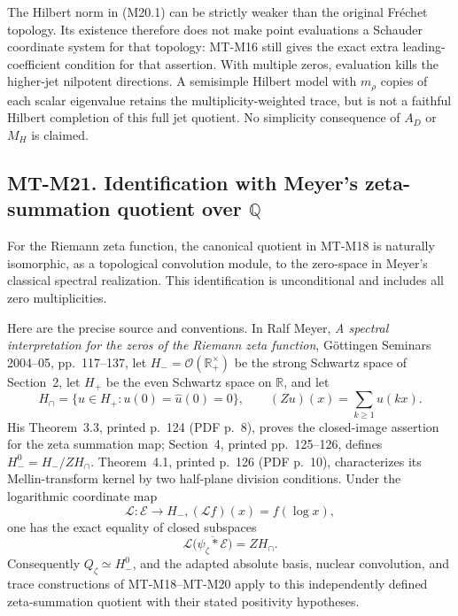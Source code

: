\documentclass[11pt,a4paper]{article}
\begin{document}
The Hilbert norm in (M20.1) can be strictly weaker than
the original Fr\'echet topology. Its existence therefore
does not make point evaluations a Schauder coordinate
system for that topology: MT-M16 still gives the exact
extra leading-coefficient condition for that assertion.
With multiple zeros, evaluation kills the higher-jet
nilpotent directions. A semisimple Hilbert model with
\(m_\rho\) copies of each scalar eigenvalue retains
the multiplicity-weighted trace, but is not a faithful
Hilbert completion of this full jet quotient. No
simplicity consequence of \(A_D\) or \(M_H\) is claimed.


\subsection*{MT-M21. Identification with Meyer's zeta-summation quotient over \(\mathbb Q\)}
For the Riemann zeta function, the canonical quotient in MT-M18
is naturally isomorphic, as a topological convolution module,
to the zero-space in Meyer's classical spectral realization.
This identification is unconditional and includes all zero
multiplicities.

Here are the precise source and conventions. In Ralf Meyer,
\emph{A spectral interpretation for the zeros of the Riemann
zeta function}, G\"ottingen Seminars 2004--05, pp.~117--137,
let \(H_- =\mathcal O(\mathbb R_+^\times)\) be the strong
Schwartz space of Section~2, let \(H_+\) be the even Schwartz
space on \(\mathbb R\), and let
\[
 H_\cap=\{u\in H_+:u(0)=\widehat u(0)=0\},\qquad
 (Zu)(x)=\sum_{k\ge1}u(kx).
\]
His Theorem~3.3, printed p.~124 (PDF p.~8), proves the
closed-image assertion for the zeta summation map; Section~4,
printed pp.~125--126, defines
\(H_-^0=H_-/ZH_\cap\).
Theorem~4.1, printed p.~126 (PDF p.~10), characterizes its
Mellin-transform kernel by two half-plane division conditions.
Under the logarithmic coordinate map
\[
       \mathcal L:\mathcal E\longrightarrow H_-,
       (\mathcal Lf)(x)=f(\log x),
\]
one has the exact equality of closed subspaces
\[
          \mathcal L\bigl(\overline{\psi_\zeta*\mathcal E}\bigr)
                         = ZH_\cap.                  \tag{M21.1}
\]
Consequently \(Q_\zeta\simeq H_-^0\), and the adapted
absolute basis, nuclear convolution, and trace constructions
of MT-M18--MT-M20 apply to this independently defined
zeta-summation quotient with their stated positivity hypotheses.
\end{document}
